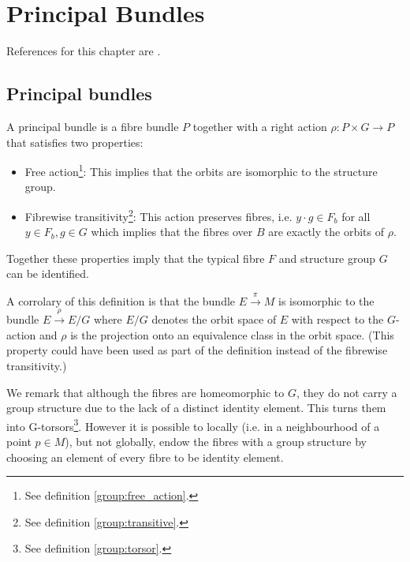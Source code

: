 



\chapter{Principal Bundles}\label{manifolds:section:principal_bundles}

References for this chapter are \cite{principal_bundles}.

\section{Principal bundles}

	\begin{definition}
		A principal bundle is a fibre bundle $P$ together with a right action $\rho:P\times G\rightarrow P$ that satisfies two properties:
		\begin{itemize}
			\item Free action\footnote{See definition \ref{group:free_action}.}: This implies that the orbits are isomorphic to the structure group.
			\item Fibrewise transitivity\footnote{See definition \ref{group:transitive}.}: This action preserves fibres, i.e. $y\cdot g\in F_b$ for all $y\in F_b, g\in G$ which implies that the fibres over $B$ are exactly the orbits of $\rho$.
		\end{itemize}
		Together these properties imply that the typical fibre $F$ and structure group $G$ can be identified.
	\end{definition}
	\begin{property}
		A corrolary of this definition is that the bundle $E\xrightarrow{\pi}M$ is isomorphic to the bundle $E\xrightarrow{\rho}E/G$ where $E/G$ denotes the orbit space of $E$ with respect to the $G$-action and $\rho$ is the projection onto an equivalence class in the orbit space. (This property could have been used as part of the definition instead of the fibrewise transitivity.)
	\end{property}
	\begin{remark}
		We remark that although the fibres are homeomorphic to $G$, they do not carry a group structure due to the lack of a distinct identity element. This turns them into G-torsors\footnote{See definition \ref{group:torsor}.}. However it is possible to locally (i.e. in a neighbourhood of a point $p\in M$), but not globally, endow the fibres with a group structure by choosing an element of every fibre to be identity element.
	\end{remark}
	
